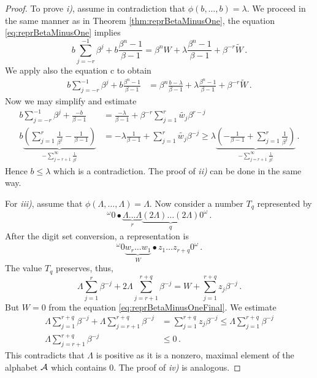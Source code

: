 \begin{proof}
To prove \textit{i)}, assume in contradiction that $\phi(b,\dots,b)= \lambda$. We proceed in the same manner as in Theorem \ref{thm:reprBetaMinusOne}, the equation \eqref{eq:reprBetaMinusOne} implies
$$
b \sum_{j=-r}^{-1} \beta^j +b\frac{\beta^n-1}{\beta-1} =  \beta^n W + \lambda \frac{\beta^n-1}{\beta-1} + \beta^{-r}\widetilde{W}\,.
$$
We apply also the equation c to obtain
\begin{align*}
b \sum_{j=-r}^{-1} \beta^j +b\frac{\beta^n-1}{\beta-1} &=  \beta^n \frac{b-\lambda}{\beta-1} + \lambda \frac{\beta^n-1}{\beta-1} + \beta^{-r}\widetilde{W}\,.
\end{align*}
Now we may simplify and estimate
\begin{align*}
b \sum_{j=-r}^{-1} \beta^j +\frac{-b}{\beta-1} &=  \frac{-\lambda}{\beta-1} + \beta^{-r}\sum_{j=1}^r\widetilde{w_j} \beta^{r-j} \\
b \underbrace{\left(\sum_{j=1}^{r} \frac{1}{\beta^j} -\frac{1}{\beta-1}\right)}_{-\sum_{j=r+1}^{\infty} \frac{1}{\beta^j}} &=  -\lambda\frac{1}{\beta-1} + \sum_{j=1}^r\widetilde{w_j} \beta^{-j}\geq  \lambda\underbrace{\left(-\frac{1}{\beta-1}+\sum_{j=1}^{r} \frac{1}{\beta^j} \right)}_{-\sum_{j=r+1}^{\infty}\frac{1}{\beta^j}}\,.
\end{align*}
Hence $b\leq\lambda$ which is a contradiction. The proof of \textit{ii)} can be done in the same way.

For \textit{iii)}, assume that $\phi(\Lambda,\dots,\Lambda)= \Lambda$. Now consider a number $T_q$ represented by
$$
^{\omega}\!0 \bullet \underbrace{\Lambda\dots\Lambda}_{r} \underbrace{(2\Lambda)\dots(2\Lambda)}_{q} 0^\omega\,.
$$
After the digit set conversion, a representation is
$$
^{\omega}\!0  \underbrace{w_r\dots w_1}_{W} \bullet z_1\dots z_{r+q} 0^\omega\,.
$$
The value $T_q$  preserves, thus,
$$
\Lambda\sum_{j=1}^r \beta^{-j} +2\Lambda \sum_{j=r+1}^{r+q} \beta^{-j}=W+\sum_{j=1}^{r+q}z_j\beta^{-j}\,.
$$
But $W=0$ from the equation \eqref{eq:reprBetaMinusOneFinal}. We estimate
\begin{align*}
\Lambda\sum_{j=1}^{r+q} \beta^{-j} +\Lambda \sum_{j=r+1}^{r+q} \beta^{-j}&=\sum_{j=1}^{r+q}z_j\beta^{-j}\leq \Lambda\sum_{j=1}^{r+q}\beta^{-j}\\
\Lambda \sum_{j=r+1}^{r+q} \beta^{-j}&\leq 0\,.
\end{align*}
This contradicts that $\Lambda$ is positive as it is a nonzero, maximal element of the alphabet $\mathcal{A}$ which contains 0. The proof of \textit{iv)} is analogous.
\end{proof}

